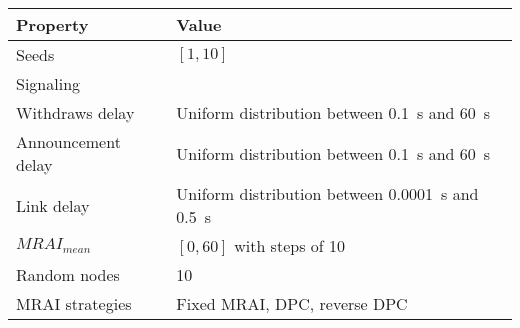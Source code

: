 \begin{center}
	\begin{tabular}{ || m{4cm}| m{8cm} || }
	\hline
	Property & Value \\
	\hline \hline
	Seeds & $[1, 10]$ \\
	\hline
	Signaling & \q{AWAWA} \\
	\hline
		Withdraws delay & Uniform distribution between \SI{0.1}{\second} and \SI{60}{\second} \\
	\hline
	Announcement delay & Uniform distribution between \SI{0.1}{\second} and \SI{60}{\second} \\
	\hline
	Link delay & Uniform distribution between \SI{0.0001}{\second} and \SI{0.5}{\second} \\
	\hline
			\(MRAI_{mean}\) & $[0, 60]$ with steps of \num{10} \\
	\hline
		Random nodes & \num{10} \\
	\hline
		\ac{MRAI} strategies & Fixed \ac{MRAI}, \ac{DPC}, reverse \ac{DPC} \\
	\hline
	\end{tabular}
\end{center}
